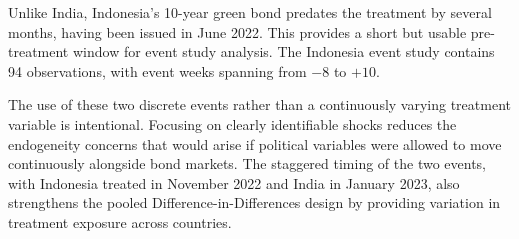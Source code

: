\documentclass[12pt,a4paper]{article}
\begin{document}
Unlike India, Indonesia’s 10-year green bond predates the treatment by several months, having been issued in June 2022. This provides a short but usable pre-treatment window for event study analysis. The Indonesia event study contains 94 observations, with event weeks spanning from $-8$ to $+10$.

The use of these two discrete events rather than a continuously varying treatment variable is intentional. Focusing on clearly identifiable shocks reduces the endogeneity concerns that would arise if political variables were allowed to move continuously alongside bond markets. The staggered timing of the two events, with Indonesia treated in November 2022 and India in January 2023, also strengthens the pooled Difference-in-Differences design by providing variation in treatment exposure across countries.


\newpage

\end{document}
